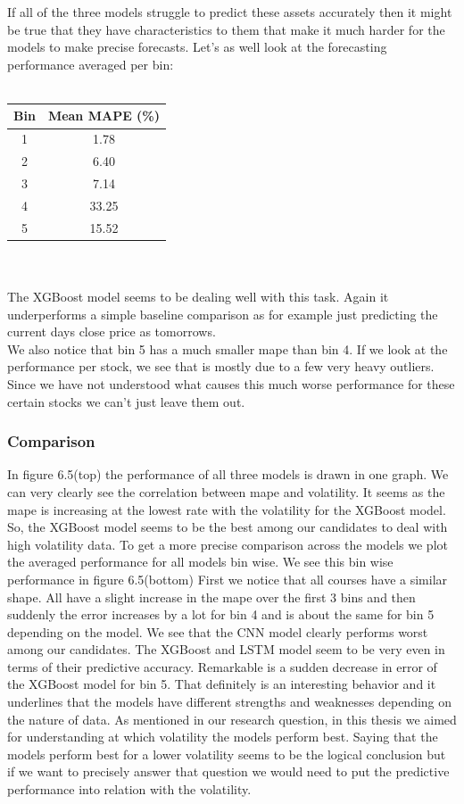 \documentclass[a4paper,12pt]{report}
\begin{document}
If all of the three models struggle to predict these assets accurately then it might be true that they have characteristics to them that make it much harder for the models to make precise forecasts. Let’s as well look at the forecasting performance averaged per bin:\\\\
	\begin{tabular}{|c|c|}
  \hline
  \textbf{Bin} & \textbf{Mean MAPE (\%)} \\
  \hline
  1 & 1.78 \\
  2 & 6.40 \\
  3 & 7.14 \\
  4 & 33.25 \\
  5 & 15.52 \\
  \hline
\end{tabular}\\\\
The XGBoost model seems to be dealing well with this task. Again it underperforms a simple baseline comparison as for example just predicting the current days close price as tomorrows. \\
We also notice that bin 5 has a much smaller mape than bin 4. If we look at the performance per stock, we see that is mostly due to a few very heavy outliers. Since we have not understood what causes this much worse performance for these certain stocks we can’t just leave them out. \\

		\subsubsection*{Comparison}



In figure 6.5(top) the performance of all three models is drawn in one graph. We can very clearly see the correlation between mape and volatility. It seems as the mape is increasing at the lowest rate with the volatility for the XGBoost model. So, the XGBoost model seems to be the best among our candidates to deal with high volatility data. To get a more precise comparison across the models we plot the averaged performance for all models bin wise. We see this bin wise performance in figure 6.5(bottom) First we notice that all courses have a similar shape. All have a slight increase in the mape over the first 3 bins and then suddenly the error increases by a lot for bin 4 and is about the same for bin 5 depending on the model. We see that the CNN model clearly performs worst among our candidates. The XGBoost and LSTM model seem to be very even in terms of their predictive accuracy. Remarkable is a sudden decrease in error of the XGBoost model for bin 5. That definitely is an interesting behavior and it underlines that the models have different strengths and weaknesses depending on the nature of data. As mentioned in our research question, in this thesis we aimed for understanding at which volatility the models perform best. Saying that the models perform best for a lower volatility seems to be the logical conclusion but if we want to precisely answer that question we would need to put the predictive performance into relation with the volatility.
\end{document}
